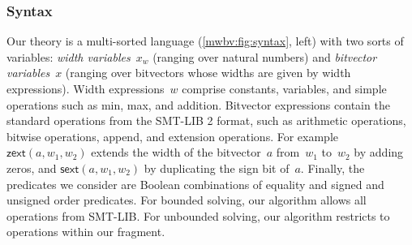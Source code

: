 \subsubsection{Syntax}
\label{mwbv:sec:syntax}

Our theory is a multi-sorted language (\cref{mwbv:fig:syntax}, left) with two sorts of variables:
\emph{width variables}~$x_w$ (ranging over natural numbers) and
\emph{bitvector variables}~$x$ (ranging over bitvectors whose widths are given by width expressions).
%
Width expressions~$w$ comprise constants, variables, and simple operations
such as min, max, and addition.
%
Bitvector expressions contain the standard operations from the SMT-LIB 2 \cite{barrett2010smt}
format, such as arithmetic operations, bitwise operations, append,
and extension operations. For example $\mathsf{zext}(a, w_1, w_2)$ extends the
width of the bitvector~$a$ from~$w_1$ to~$w_2$ by adding zeros, and
$\mathsf{sext}(a, w_1, w_2)$ by duplicating the sign bit of~$a$.
%
Finally, the predicates we consider are Boolean combinations of equality and
signed and unsigned order predicates.
For bounded solving, our algorithm allows all operations from SMT-LIB. For unbounded solving,
our algorithm restricts to operations within our fragment.

